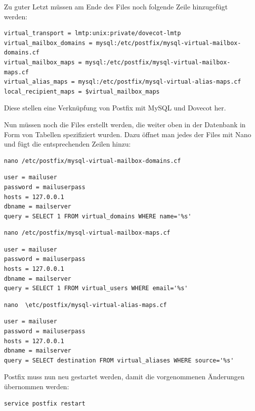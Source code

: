 Zu guter Letzt müssen am Ende des Files noch folgende Zeile hinzugefügt werden:

\begin{lstlisting}
virtual_transport = lmtp:unix:private/dovecot-lmtp
virtual_mailbox_domains = mysql:/etc/postfix/mysql-virtual-mailbox-domains.cf
virtual_mailbox_maps = mysql:/etc/postfix/mysql-virtual-mailbox-maps.cf
virtual_alias_maps = mysql:/etc/postfix/mysql-virtual-alias-maps.cf
local_recipient_maps = $virtual_mailbox_maps
\end{lstlisting}

Diese stellen eine Verknüpfung von Postfix mit MySQL und Dovecot her.

Nun müssen noch die Files erstellt werden, die weiter oben in der Datenbank in Form von Tabellen spezifiziert wurden. Dazu öffnet man jedes der Files mit Nano und fügt die entsprechenden Zeilen hinzu: 

\begin{lstlisting}
nano /etc/postfix/mysql-virtual-mailbox-domains.cf
\end{lstlisting}

\begin{lstlisting}
user = mailuser
password = mailuserpass
hosts = 127.0.0.1
dbname = mailserver
query = SELECT 1 FROM virtual_domains WHERE name='%s'
\end{lstlisting}

\begin{lstlisting}
nano /etc/postfix/mysql-virtual-mailbox-maps.cf
\end{lstlisting}

\begin{lstlisting}
user = mailuser
password = mailuserpass
hosts = 127.0.0.1
dbname = mailserver
query = SELECT 1 FROM virtual_users WHERE email='%s'
\end{lstlisting}

\begin{lstlisting}
nano  \etc/postfix/mysql-virtual-alias-maps.cf
\end{lstlisting}

\begin{lstlisting}
user = mailuser
password = mailuserpass
hosts = 127.0.0.1
dbname = mailserver
query = SELECT destination FROM virtual_aliases WHERE source='%s'
\end{lstlisting}

Postfix muss nun neu gestartet werden, damit die vorgenommenen Änderungen übernommen werden:

\begin{lstlisting}
service postfix restart
\end{lstlisting}


